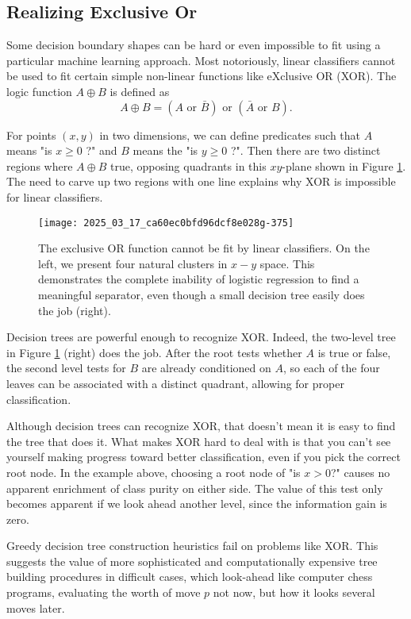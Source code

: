 \documentclass[10pt]{article}
\begin{document}
\begin{enumerate}
\subsection*{Realizing Exclusive Or}
Some decision boundary shapes can be hard or even impossible to fit using a particular machine learning approach. Most notoriously, linear classifiers cannot be used to fit certain simple non-linear functions like eXclusive OR (XOR). The logic function $A \oplus B$ is defined as
\[
A \oplus B=(A \text { or } \bar{B}) \text { or }(\bar{A} \text { or } B).
\]

For points $(x, y)$ in two dimensions, we can define predicates such that $A$ means "is $x \geq 0$ ?" and $B$ means the "is $y \geq 0$ ?". Then there are two distinct regions where $A \oplus B$ true, opposing quadrants in this $xy$-plane shown in Figure \ref{fig:xor_plane}. The need to carve up two regions with one line explains why XOR is impossible for linear classifiers.

\begin{figure}[h!]
\centering
\texttt{[image: 2025\_03\_17\_ca60ec0bfd96dcf8e028g-375]}
\caption{The exclusive OR function cannot be fit by linear classifiers. On the left, we present four natural clusters in $x-y$ space. This demonstrates the complete inability of logistic regression to find a meaningful separator, even though a small decision tree easily does the job (right).}\label{fig:xor_plane}
\end{figure}

Decision trees are powerful enough to recognize XOR. Indeed, the two-level tree in Figure \ref{fig:xor_plane} (right) does the job. After the root tests whether $A$ is true or false, the second level tests for $B$ are already conditioned on $A$, so each of the four leaves can be associated with a distinct quadrant, allowing for proper classification.

Although decision trees can recognize XOR, that doesn't mean it is easy to find the tree that does it. What makes XOR hard to deal with is that you can't see yourself making progress toward better classification, even if you pick the correct root node. In the example above, choosing a root node of "is $x>0$?" causes no apparent enrichment of class purity on either side. The value of this test only becomes apparent if we look ahead another level, since the information gain is zero.

Greedy decision tree construction heuristics fail on problems like XOR. This suggests the value of more sophisticated and computationally expensive tree building procedures in difficult cases, which look-ahead like computer chess programs, evaluating the worth of move $p$ not now, but how it looks several moves later.


\end{enumerate}
\end{document}

